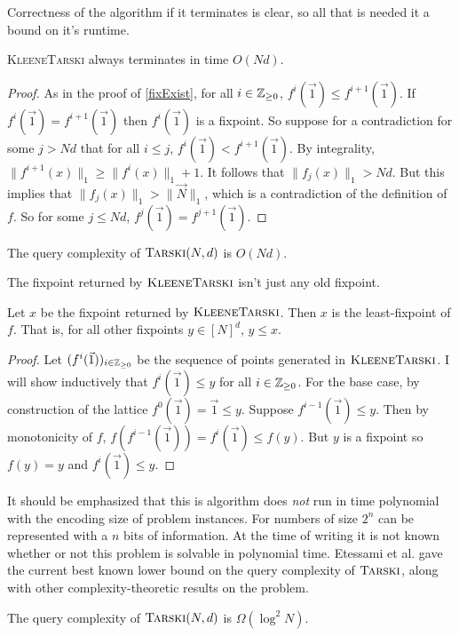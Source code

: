 Correctness of the algorithm if it terminates is clear, so all that is needed it a bound on it's runtime.
\begin{lemma}
  \textsc{KleeneTarski} always terminates in time $O(Nd)$.
\end{lemma}
\begin{proof}
  As in the proof of \cref{fixExist}, for all $i \in \mathbb{Z}_{\geq 0}$, $f^i(\vec{1}) \leq f^{i+1}(\vec{1})$. If $f^i(\vec{1}) = f^{i+1}(\vec{1})$
  then $f^i(\vec{1})$ is a fixpoint. So suppose for a contradiction for some $j > Nd$ that for all $i \leq j$, $f^i(\vec{1}) < f^{i+1}(\vec{1})$. 
  By integrality, $\|f^{i+1}(x)\|_1 \geq \|f^i(x)\|_1 + 1$. It follows that $\|f_j(x)\|_1 > Nd$. But this implies that
  $\|f_j(x)\|_1 > \|\vec{N}\|_1$, which is a contradiction of the definition of $f$. So for some $j \leq Nd$, $f^j(\vec{1}) = f^{j+1}(\vec{1})$.
\end{proof}
\begin{theorem}
  The query complexity of $\textsc{Tarski}(N,d)$ is $O(Nd)$.
\end{theorem}
The fixpoint returned by $\textsc{KleeneTarski}$ isn't just any old fixpoint.
\begin{lemma}\label{kleeneLfp}
  Let $x$ be the fixpoint returned by $\textsc{KleeneTarski}$. Then $x$ is the least-fixpoint
  of $f$. That is, for all other fixpoints $y \in [N]^d$, $y \leq x$.
\end{lemma}
\begin{proof}
  Let $(f^i(\vec{1}))_{i \in \mathbb{Z}_{\geq 0}}$ be the sequence of points generated in $\textsc{KleeneTarski}$.
  I will show inductively that $f^i(\vec{1}) \leq y$ for all $i \in \mathbb{Z}_{\geq 0}$. For the base case,
  by construction of the lattice $f^0(\vec{1}) = \vec{1} \leq y$. Suppose $f^{i-1}(\vec{1}) \leq y$.
  Then by monotonicity of $f$, $f(f^{i-1}(\vec{1})) = f^i(\vec{1}) \leq f(y)$. But $y$ is a fixpoint
  so $f(y) = y$ and $f^i(\vec{1}) \leq y$.
\end{proof}
It should be emphasized that this is algorithm does \emph{not} run in time polynomial with the encoding size
of problem instances. For numbers of size $2^n$ can be represented with a $n$ bits of information. 
At the time of writing
it is not known whether or not this problem is solvable in polynomial time.
Etessami et al. gave the current best known lower bound on the query complexity of $\textsc{Tarski}$, along with other complexity-theoretic results
on the problem.
\begin{theorem}
  The query complexity of $\textsc{Tarski}(N, d)$ is $\Omega(\log^2N)$.
\end{theorem}
